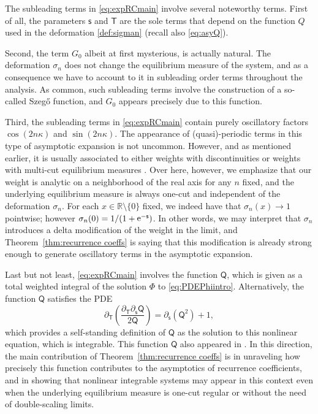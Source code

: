 \documentclass[reqno,a4paper,11pt]{amsart}
\DeclareMathOperator{\ee}{\rm e}
\newcommand{\R}{\mathbb{R}}
\newcommand{\msf}{\mathsf}
\newcommand{\sad}{\msf s}
\theoremstyle{definition}
\theoremstyle{remark}
\numberwithin{equation}{section}
\begin{document}
The subleading terms in \eqref{eq:expRCmain} involve several noteworthy terms. First of all, the parameters $\sad$ and $\msf T$ are the sole terms that depend on the function $Q$ used in the deformation \eqref{def:sigman} (recall also \eqref{eq:asyQ}). 

Second, the term $G_0$ albeit at first mysterious, is actually natural. The deformation $\sigma_n$ does not change the equilibrium measure of the system, and as a consequence we have to account to it in subleading order terms throughout the analysis. As common, such subleading terms involve the construction of a so-called Szegő function, and $G_0$ appears precisely due to this function.

Third, the subleading terms in \eqref{eq:expRCmain} contain purely oscillatory factors $\cos(2n\kappa)$ and $\sin(2n\kappa)$. The appearance of (quasi)-periodic terms in this type of asymptotic expansion is not uncommon. However, and as mentioned earlier, it is usually associated to either weights with discontinuities \cite{FoulquieMartinezFinkelshteinSousa2011} or weights with multi-cut equilibrium measures \cite{DKMVZ1, bleher_its}. Over here, however, we emphasize that our weight is analytic on a neighborhood of the real axis for any $n$ fixed, and the underlying equilibrium measure is always one-cut and independent of the deformation $\sigma_n$. For each $x\in \R\setminus \{0\}$ fixed, we indeed have that $\sigma_n(x)\to 1$ pointwise; however $\sigma_n(0)=1/(1+\ee^{-\sad})$. In other words, we may interpret that $\sigma_n$ introduces a delta modification of the weight in the limit, and Theorem~\ref{thm:recurrence coeffs} is saying that this modification is already strong enough to generate oscillatory terms in the asymptotic expansion.

Last but not least, \eqref{eq:expRCmain} involves the function $\msf Q$, which is given as a total weighted integral of the solution $\msf \Phi$ to \eqref{eq:PDEPhiintro}. Alternatively, the function $\msf Q$ satisfies the PDE
%
\begin{equation}\label{eq:PDEQintro}
\partial_{\msf T} \left( \frac{ \partial_{\msf T} \partial_{\sad} \msf Q }{ 2\msf Q } \right) =  \partial_\sad (\msf Q^2) + 1,
\end{equation}
%
which provides a self-standing definition of $\msf Q$ as the solution to this nonlinear equation, which is integrable. This function $\msf Q$ also appeared in \cite{ClaeysTarricone24}. In this direction, the main contribution of Theorem~\ref{thm:recurrence coeffs} is in unraveling how precisely this function contributes to the asymptotics of recurrence coefficients, and in showing that nonlinear integrable systems may appear in this context even when the underlying equilibrium measure is one-cut regular or without the need of double-scaling limits.
\end{document}
